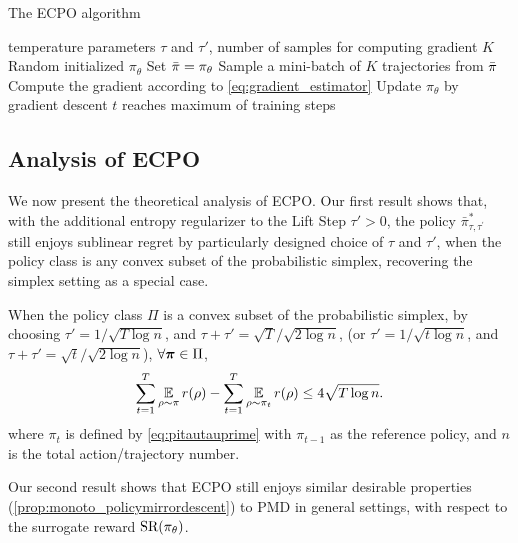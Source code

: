 \begin{algorithm}[t]
	\caption{\label{alg:ECPO}  The ECPO algorithm}
	\begin{algorithmic}[1]
		\INPUT temperature parameters $\tau$ and $\tau'$, number of samples for computing gradient $K$
		\STATE Random initialized $\pi_{\theta}$
		\STATE Set $\bar{\pi} = \pi_\theta$
		\REPEAT 
		\STATE Sample a mini-batch of $K$ trajectories from $\bar{\pi}$
		\STATE Compute the gradient according to \cref{eq:gradient_estimator}
		\STATE Update $\pi_{\theta}$ by gradient descent
		\UNTIL $t$ reaches maximum of training steps
		\ENDFOR
	\end{algorithmic}
\end{algorithm}


\subsection{Analysis of ECPO}
We now present the theoretical analysis of ECPO. Our first result shows that, with the additional entropy regularizer to the Lift Step $\tau' > 0$, the policy $\bar{\pi}_{\tau,\tau^{\prime}}^*$ still enjoys sublinear regret by particularly designed choice of $\tau$ and $\tau'$, when the policy class is any convex subset of the probabilistic simplex, recovering the simplex setting as a special case. 

\begin{thm}
\label{thm:sublinear_regret_convex_subset}
When the policy class $\Pi$ is a convex subset of the probabilistic simplex, by choosing $\tau'=1/\sqrt{T\log{n}}$, and $\tau + \tau' = \sqrt{T} / \sqrt{2\log n}$, (or $\tau'=1/\sqrt{t\log{n}}$, and $\tau + \tau' = \sqrt{t} / \sqrt{2\log n}$), $\forall {\boldsymbol{\pi}} \in \Pi$,
\begin{equation*}
    \sum\limits_{t=1}^{T}{ \operatorname*{\mathbb{E}}\limits_{\rho \sim \pi}{r(\rho)} } - \sum\limits_{t=1}^{T}{  \operatorname*{\mathbb{E}}\limits_{\rho \sim \pi_t}{r(\rho)}  } \le 4\sqrt{T\log n}.
\end{equation*}
where $\pi_{t}$ is defined by \cref{eq:pitautauprime} with $\pi_{t-1}$ as the reference policy, and $n$ is the total action/trajectory number.
\end{thm}

Our second result shows that ECPO still enjoys similar desirable properties (\cref{prop:monoto_policymirrordescent}) to PMD
in general settings, with respect to the surrogate reward $\text{SR}(\pi_\theta)$.


